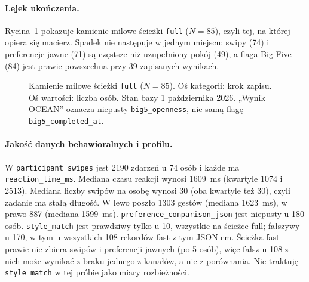 \paragraph{Lejek ukończenia.}
Rycina~\ref{fig:ch08:funnel} pokazuje kamienie milowe ścieżki \texttt{full} ($N=85$), czyli tej, na której opiera się macierz. Spadek nie następuje w jednym miejscu: swipy (74) i preferencje jawne (71) są częstsze niż uzupełniony pokój (49), a flaga Big Five (84) jest prawie powszechna przy 39 zapisanych wynikach.

\begin{figure}[htbp]
  \centering
  \caption{Kamienie milowe ścieżki \texttt{full} ($N=85$). Oś kategorii: krok zapisu. Oś wartości: liczba osób. Stan bazy 1 października 2026. „Wynik OCEAN” oznacza niepusty \texttt{big5\_openness}, nie samą flagę \texttt{big5\_completed\_at}.}
  \label{fig:ch08:funnel}
\end{figure}

\paragraph{Jakość danych behawioralnych i profilu.}
W \texttt{participant\_swipes} jest 2190 zdarzeń u 74 osób i każde ma \texttt{reaction\_time\_ms}. Mediana czasu reakcji wynosi 1609~ms (kwartyle 1074 i 2513). Mediana liczby swipów na osobę wynosi 30 (oba kwartyle też 30), czyli zadanie ma stałą długość. W lewo poszło 1303 gestów (mediana 1623~ms), w prawo 887 (mediana 1599~ms).
\texttt{preference\_comparison\_json} jest niepusty u 180 osób. \texttt{style\_match} jest prawdziwy tylko u 10, wszystkie na ścieżce full; fałszywy u 170, w tym u wszystkich 108 rekordów fast z tym JSON-em. Ścieżka fast prawie nie zbiera swipów i preferencji jawnych (po 5 osób), więc fałsz u 108 z nich może wynikać z braku jednego z kanałów, a nie z porównania. Nie traktuję \texttt{style\_match} w tej próbie jako miary rozbieżności.

